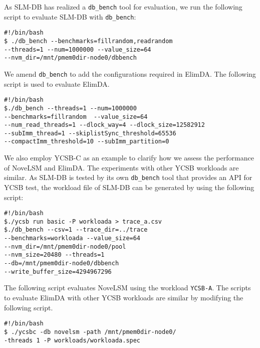 \documentclass[letterpaper,twocolumn,10pt]{usetex-v1}
\newcommand\sysname{\textsf{ElimDA}\xspace}
\renewcommand{\paragraph}[1]{\smallskip\noindent {\bf #1}}
\begin{document}
As SLM-DB has realized a {\tt db\_bench} tool for
evaluation, we run the following script to evaluate
SLM-DB with {\tt db\_bench}:
\begin{verbatim}
#!/bin/bash
$ ./db_bench --benchmarks=fillrandom,readrandom
--threads=1 --num=1000000 --value_size=64
--nvm_dir=/mnt/pmem0dir-node0/dbbench
\end{verbatim}

We amend {\tt db\_bench} to add the configurations required
in \sysname. The following script is used to evaluate \sysname.
\begin{verbatim}
#!/bin/bash
$./db_bench --threads=1 --num=1000000
--benchmarks=fillrandom  --value_size=64
--num_read_threads=1 --dlock_way=4 --dlock_size=12582912
--subImm_thread=1 --skiplistSync_threshold=65536
--compactImm_threshold=10 --subImm_partition=0
\end{verbatim}

\paragraph{Experiments with YCSB:}
We also employ YCSB-C \cite{ycsbc} as an example to clarify how we assess
the performance of NoveLSM and \sysname. The experiments with
other YCSB workloads are similar.
As SLM-DB is tested by its own {\tt db\_bench} tool that provides an API for YCSB
test, the workload file of SLM-DB can be generated by using the following script:
\begin{verbatim}
#!/bin/bash
$./ycsb run basic -P workloada > trace_a.csv
$./db_bench --csv=1 --trace_dir=../trace
--benchmarks=workloada --value_size=64
--nvm_dir=/mnt/pmem0dir-node0/pool
--nvm_size=20480 --threads=1
--db=/mnt/pmem0dir-node0/dbbench
--write_buffer_size=4294967296
\end{verbatim}

The following script evaluates NoveLSM using the workload
{\tt YCSB-A}. The scripts to evaluate \sysname with other
YCSB workloads are similar by modifying the following script.
\begin{verbatim}
#!/bin/bash
$ ./ycsbc -db novelsm -path /mnt/pmem0dir-node0/
-threads 1 -P workloads/workloada.spec
\end{verbatim}




\end{document}
